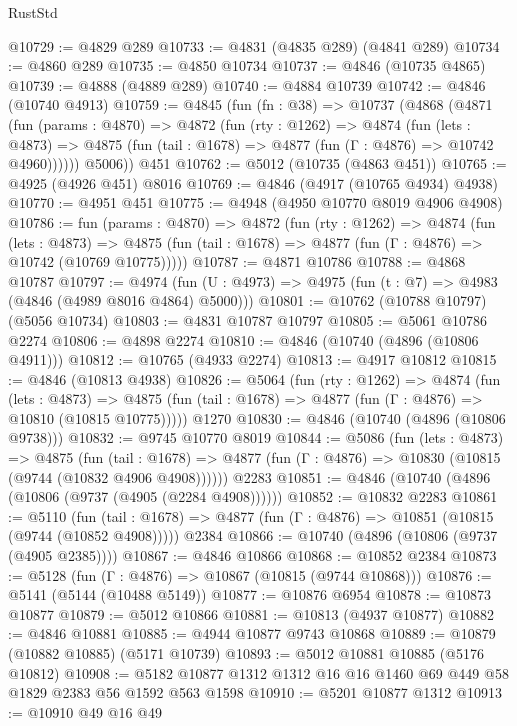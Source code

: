 \begin{lexlean}{RustStd}
\begin{coremodule}
@10729 := @4829 @289
@10733 := @4831 (@4835 @289) (@4841 @289)
@10734 := @4860 @289
@10735 := @4850 @10734
@10737 := @4846 (@10735 @4865)
@10739 := @4888 (@4889 @289)
@10740 := @4884 @10739
@10742 := @4846 (@10740 @4913)
@10759 := @4845
    (fun (fn : @38) =>
    @10737
      (@4868
        (@4871
          (fun (params : @4870) =>
          @4872
            (fun (rty : @1262) =>
            @4874
              (fun (lets : @4873) =>
              @4875 (fun (tail : @1678) => @4877 (fun (Γ : @4876) => @10742 @4960))))))
        @5006))
    @451
@10762 := @5012 (@10735 (@4863 @451))
@10765 := @4925 (@4926 @451) @8016
@10769 := @4846 (@4917 (@10765 @4934) @4938)
@10770 := @4951 @451
@10775 := @4948 (@4950 @10770 @8019 @4906 @4908)
@10786 := fun (params : @4870) =>
  @4872
    (fun (rty : @1262) =>
    @4874
      (fun (lets : @4873) =>
      @4875 (fun (tail : @1678) => @4877 (fun (Γ : @4876) => @10742 (@10769 @10775)))))
@10787 := @4871 @10786
@10788 := @4868 @10787
@10797 := @4974 (fun (U : @4973) => @4975 (fun (t : @7) => @4983 (@4846 (@4989 @8016 @4864) @5000)))
@10801 := @10762 (@10788 @10797) (@5056 @10734)
@10803 := @4831 @10787 @10797
@10805 := @5061 @10786 @2274
@10806 := @4898 @2274
@10810 := @4846 (@10740 (@4896 (@10806 @4911)))
@10812 := @10765 (@4933 @2274)
@10813 := @4917 @10812
@10815 := @4846 (@10813 @4938)
@10826 := @5064
    (fun (rty : @1262) =>
    @4874
      (fun (lets : @4873) =>
      @4875 (fun (tail : @1678) => @4877 (fun (Γ : @4876) => @10810 (@10815 @10775)))))
    @1270
@10830 := @4846 (@10740 (@4896 (@10806 @9738)))
@10832 := @9745 @10770 @8019
@10844 := @5086
    (fun (lets : @4873) =>
    @4875
      (fun (tail : @1678) =>
      @4877 (fun (Γ : @4876) => @10830 (@10815 (@9744 (@10832 @4906 @4908))))))
    @2283
@10851 := @4846 (@10740 (@4896 (@10806 (@9737 (@4905 (@2284 @4908))))))
@10852 := @10832 @2283
@10861 := @5110
    (fun (tail : @1678) => @4877 (fun (Γ : @4876) => @10851 (@10815 (@9744 (@10852 @4908)))))
    @2384
@10866 := @10740 (@4896 (@10806 (@9737 (@4905 @2385))))
@10867 := @4846 @10866
@10868 := @10852 @2384
@10873 := @5128 (fun (Γ : @4876) => @10867 (@10815 (@9744 @10868)))
@10876 := @5141 (@5144 (@10488 @5149))
@10877 := @10876 @6954
@10878 := @10873 @10877
@10879 := @5012 @10866
@10881 := @10813 (@4937 @10877)
@10882 := @4846 @10881
@10885 := @4944 @10877 @9743 @10868
@10889 := @10879 (@10882 @10885) (@5171 @10739)
@10893 := @5012 @10881 @10885 (@5176 @10812)
@10908 := @5182 @10877 @1312 @1312 @16 @16 @1460 @69 @449 @58 @1829 @2383 @56 @1592 @563 @1598
@10910 := @5201 @10877 @1312
@10913 := @10910 @49 @16 @49

\end{coremodule}
\end{lexlean}
